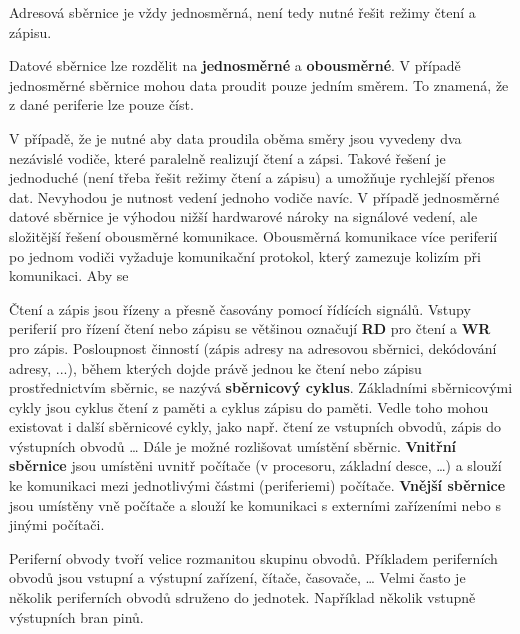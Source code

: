 Adresová sběrnice je vždy jednosměrná, není tedy nutné řešit režimy čtení a zápisu.


Datové sběrnice lze rozdělit na {\bf jednosměrné} a {\bf obousměrné}. V případě jednosměrné sběrnice mohou data proudit pouze jedním směrem. To znamená, že z dané periferie lze pouze číst. 

V případě, že je nutné aby data proudila oběma směry jsou vyvedeny dva nezávislé vodiče, které paralelně realizují čtení a zápsi. Takové řešení je jednoduché (není třeba řešit režimy čtení a zápisu) a umožňuje rychlejší přenos dat. Nevyhodou je nutnost vedení jednoho vodiče navíc. V případě jednosměrné datové sběrnice je výhodou nižší hardwarové nároky na signálové vedení, ale složitější řešení obousměrné komunikace. Obousměrná komunikace více periferií po jednom vodiči vyžaduje komunikační protokol, který zamezuje kolizím při komunikaci. Aby se 

 

Čtení a zápis jsou řízeny a přesně časovány pomocí řídících signálů. Vstupy periferií pro řízení čtení nebo zápisu se většinou označují {\bf RD} pro čtení a {\bf WR} pro zápis. Posloupnost činností (zápis adresy na adresovou sběrnici, dekódování adresy, ...), během kterých dojde právě jednou ke čtení nebo zápisu prostřednictvím sběrnic, se nazývá {\bf sběrnicový cyklus}. Základními sběrnicovými cykly jsou cyklus čtení z paměti a cyklus zápisu do paměti. Vedle toho mohou existovat i další sběrnicové cykly, jako např. čtení ze vstupních obvodů, zápis do výstupních obvodů … 
Dále je možné rozlišovat umístění sběrnic. {\bf Vnitřní sběrnice} jsou umístěni uvnitř počítače (v procesoru, základní desce, …) a slouží ke komunikaci mezi jednotlivými částmi (periferiemi) počítače. {\bf Vnější sběrnice} jsou umístěny vně počítače a slouží ke komunikaci s externími zařízeními nebo s jinými počítači.


Periferní obvody tvoří velice rozmanitou skupinu obvodů. Příkladem periferních obvodů jsou vstupní a výstupní zařízení, čítače, časovače, … Velmi často je několik periferních obvodů sdruženo do jednotek. Například několik vstupně výstupních bran pinů.

